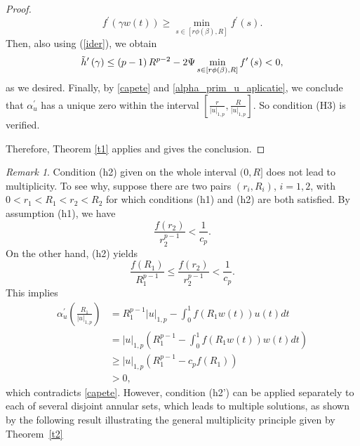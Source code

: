 \documentclass{birkjour}
\theoremstyle{definition}
\theoremstyle{remark}
\newtheorem{remark}[theorem]{Remark}
\numberwithin{equation}{section}
\begin{document}
\begin{proof}
\begin{equation*}
f^{\prime }(\gamma w\left( t\right) )\geq \min_{s\in \left[ r\phi \left(
\beta \right) ,R\right] }f^{\prime }\left( s\right) .
\end{equation*}%
Then, also using (\ref{ider}), we obtain
\begin{equation*}
\Tilde{h}^{\prime }\left( \gamma \right) \leq \left( p-1\right)
R^{p-2}-2\Psi \min_{s\in \left[ r\phi \left( \beta \right) ,R\right]
}f^{\prime }\left( s\right) <0,
\end{equation*}%
as we desired. %
Finally, by \eqref{capete} and \eqref{alpha_prim_u_aplicatie}, we conclude
that $\alpha _{u}^{\prime }$ has a unique zero within the interval $\left[
\frac{r}{|u|_{1,p}},\frac{R}{|u|_{1,p}}\right] .$ So condition (H3) is
verified.

Therefore, Theorem \ref{t1} applies and gives the conclusion.
\end{proof}

\begin{remark}
Condition (h2) given on the whole interval $(0,R]$ does not lead to
multiplicity. To see why, suppose there are two pairs $(r_{i},R_{i})$, $%
i=1,2 $, with $0<r_{1}<R_{1}<r_{2}<R_{2}$ for which conditions (h1) and (h2)
are both satisfied. By assumption (h1), we have
\begin{equation*}
\frac{f(r_{2})}{r_{2}^{p-1}}<\frac{1}{c_{p}}.
\end{equation*}%
On the other hand, (h2) yields
\begin{equation*}
\frac{f(R_{1})}{R_{1}^{p-1}}\leq \frac{f(r_{2})}{r_{2}^{p-1}}<\frac{1}{c_{p}}%
.
\end{equation*}%
This implies
\begin{align*}
\alpha _{u}^{\prime }\left( \frac{R_{1}}{|u|_{1,p}}\right) &
=R_{1}^{p-1}|u|_{1,p}-\int_{0}^{1}f(R_{1}w(t))u(t)dt \\
& =|u|_{1,p}\left( R_{1}^{p-1}-\int_{0}^{1}f(R_{1}w(t))w(t)dt\right) \\
& \geq |u|_{1,p}\left( R_{1}^{p-1}-c_{p}f(R_{1})\right) \\
& >0,
\end{align*}%
which contradicts \eqref{capete}. However, condition (h2') can be applied
separately to each of several disjoint annular sets, which leads to multiple
solutions, as shown by the following result illustrating the general
multiplicity principle given by Theorem~\ref{t2}
\end{remark}
\end{document}
